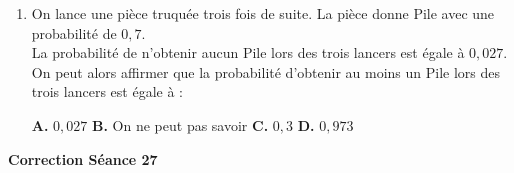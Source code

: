 \documentclass[a4paper,11pt]{article}
\begin{document}
\begin{seance}{}
\begin{enumerate}
\medskip
\begin{center}
\textbf{\textcolor{Couleur1}{A.}} $\left]-\infty\,;\,\dfrac{11}{9}\right[$ \qquad \textbf{\textcolor{Couleur1}{B.}} $\left]-\infty\,;\,\dfrac{9}{11}\right[$ \qquad \textbf{\textcolor{Couleur1}{C.}} $\left]\dfrac{11}{9}\,;\, +\infty\right[$ \qquad \textbf{\textcolor{Couleur1}{D.}} $\left]\dfrac{9}{11}\,;\, +\infty\right[$
\end{center}


\item On lance une pièce truquée trois fois de suite.
        La pièce donne Pile avec une probabilité de $0{,}7$. \\
        La probabilité de n'obtenir aucun Pile lors des trois lancers est égale à $0{,}027$.
On peut alors affirmer que la probabilité d'obtenir au moins un Pile lors des trois lancers est égale à :

\medskip
\begin{center}
\textbf{\textcolor{Couleur1}{A.}} $0{,}027$ \qquad \textbf{\textcolor{Couleur1}{B.}} On ne peut pas savoir \qquad \textbf{\textcolor{Couleur1}{C.}} $0{,}3$ \qquad \textbf{\textcolor{Couleur1}{D.}} $0{,}973$
\end{center}


\end{enumerate}

\end{seance}
\vspace{0.5cm}
\begin{center}

\textbf{\textcolor{Couleur8}{Correction Séance 27}}\\
\vspace{2mm}

\end{center}

\newpage
\end{document}
